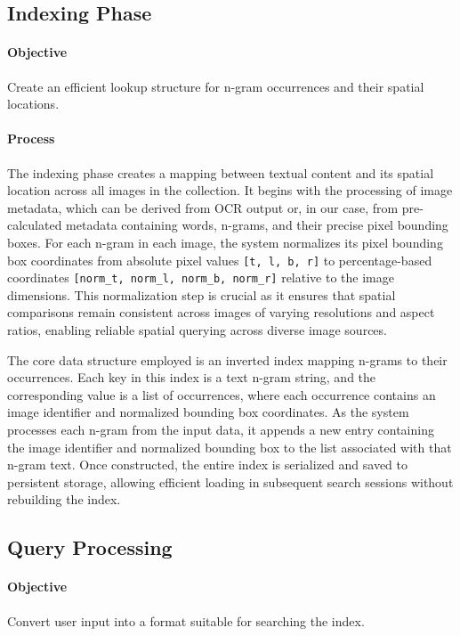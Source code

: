 \documentclass[manuscript,screen]{acmart}
\begin{document}
\subsection{Indexing Phase}

\paragraph{Objective} Create an efficient lookup structure for n-gram occurrences and their spatial locations.

\paragraph{Process} The indexing phase creates a mapping between textual content and its spatial location across all images in the collection. It begins with the processing of image metadata, which can be derived from OCR output or, in our case, from pre-calculated metadata containing words, n-grams, and their precise pixel bounding boxes. For each n-gram in each image, the system normalizes its pixel bounding box coordinates from absolute pixel values \verb|[t, l, b, r]| to percentage-based coordinates \verb|[norm_t, norm_l, norm_b, norm_r]| relative to the image dimensions. This normalization step is crucial as it ensures that spatial comparisons remain consistent across images of varying resolutions and aspect ratios, enabling reliable spatial querying across diverse image sources.

The core data structure employed is an inverted index mapping n-grams to their occurrences. Each key in this index is a text n-gram string, and the corresponding value is a list of occurrences, where each occurrence contains an image identifier and normalized bounding box coordinates. As the system processes each n-gram from the input data, it appends a new entry containing the image identifier and normalized bounding box to the list associated with that n-gram text. Once constructed, the entire index is serialized and saved to persistent storage, allowing efficient loading in subsequent search sessions without rebuilding the index.

\subsection{Query Processing}

\paragraph{Objective} Convert user input into a format suitable for searching the index.
\end{document}
